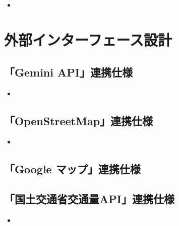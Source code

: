 \documentclass{docs}
\begin{document}
\subsection{}
\begin{itemize}
	\item
\end{itemize}

\section{外部インターフェース設計}

\subsection{「Gemini API」連携仕様}
\begin{itemize}
    \item
\end{itemize}

\subsection{「OpenStreetMap」連携仕様}
\begin{itemize}
    \item
\end{itemize}

\subsection{「Google マップ」連携仕様}

\subsection{「国土交通省交通量API」連携仕様}
\begin{itemize}
    \item
\end{itemize}
\end{document}
